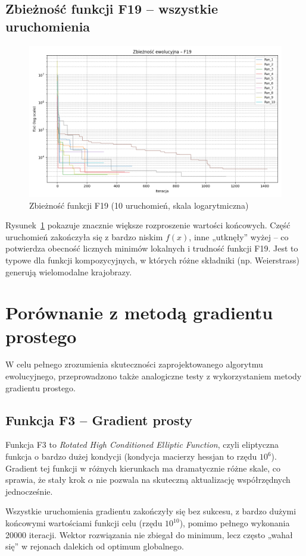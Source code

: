 \documentclass[a4paper]{article}
\begin{document}
\subsection{Zbieżność funkcji F19 – wszystkie uruchomienia}

\begin{figure}[H]
    \centering
    \includegraphics[width=0.6\linewidth]{F19_log_plot.png}
    \caption{Zbieżność funkcji F19 (10 uruchomień, skala logarytmiczna)}
    \label{fig:f19log}
\end{figure}

Rysunek~\ref{fig:f19log} pokazuje znacznie większe rozproszenie wartości końcowych.  
Część uruchomień zakończyła się z bardzo niskim \(f(x)\), inne „utknęły” wyżej – co potwierdza obecność licznych minimów lokalnych i trudność funkcji F19.  
Jest to typowe dla funkcji kompozycyjnych, w których różne składniki (np. Weierstrass) generują wielomodalne krajobrazy.


\section{Porównanie z metodą gradientu prostego}

W celu pełnego zrozumienia skuteczności zaprojektowanego algorytmu ewolucyjnego, przeprowadzono także analogiczne testy z wykorzystaniem metody gradientu prostego.  

\subsection{Funkcja F3 – Gradient prosty}

Funkcja F3 to \emph{Rotated High Conditioned Elliptic Function}, czyli eliptyczna funkcja o bardzo dużej kondycji (kondycja macierzy hessjan to rzędu $10^6$).  
Gradient tej funkcji w różnych kierunkach ma dramatycznie różne skale, co sprawia, że stały krok \(\alpha\) nie pozwala na skuteczną aktualizację współrzędnych jednocześnie.

Wszystkie uruchomienia gradientu zakończyły się bez sukcesu, z bardzo dużymi końcowymi wartościami funkcji celu (rzędu \(10^{10}\)), pomimo pełnego wykonania 20000 iteracji.  
Wektor rozwiązania nie zbiegał do minimum, lecz często „wahał się” w rejonach dalekich od optimum globalnego.
\end{document}
